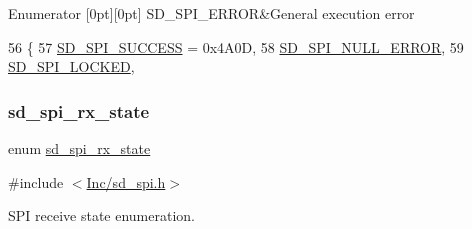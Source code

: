 \begin{DoxyEnumFields}{Enumerator}
[0pt][0pt]{}\mbox{\label{group___s_d___s_p_i___types_gga9ae67f7089a8196e9c6b74b8a6708c2eae8bfc341906b1dcb2431a61007acd4f0}} 
S\+D\+\_\+\+S\+P\+I\+\_\+\+E\+R\+R\+OR&General execution error \\
\hline

\end{DoxyEnumFields}

\begin{DoxyCode}
56                   \{
57     \mbox{\hyperlink{group___s_d___s_p_i___types_gga9ae67f7089a8196e9c6b74b8a6708c2ea109567296b93a03b1949407009750681}{SD\_SPI\_SUCCESS}} = 0x4A0D,      
58     \mbox{\hyperlink{group___s_d___s_p_i___types_gga9ae67f7089a8196e9c6b74b8a6708c2eaad5c42032f18bd5aafbbf60754614fc1}{SD\_SPI\_NULL\_ERROR}},         
59     \mbox{\hyperlink{group___s_d___s_p_i___types_gga9ae67f7089a8196e9c6b74b8a6708c2eaa7e23f729a2493076dfb261678471c24}{SD\_SPI\_LOCKED}},             
\end{DoxyCode}
\mbox{\label{group___s_d___s_p_i___types_ga0cf86b44c1bee9173f49395d05e076d5}} 
\subsubsection{\texorpdfstring{sd\+\_\+spi\+\_\+rx\+\_\+state}{sd\_spi\_rx\_state}}
{\footnotesize\ttfamily enum \mbox{\hyperlink{group___s_d___s_p_i___types_ga0cf86b44c1bee9173f49395d05e076d5}{sd\+\_\+spi\+\_\+rx\+\_\+state}}}



{\ttfamily \#include $<$\mbox{\hyperlink{sd__spi_8h}{Inc/sd\+\_\+spi.\+h}}$>$}



S\+PI receive state enumeration. 

